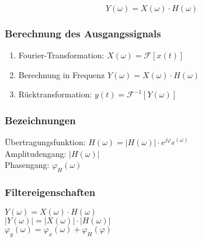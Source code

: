 \begin{multicols}{2}
    $$ Y(\omega) = X(\omega) \cdot H(\omega)$$

    \subsubsection*{Berechnung des Ausgangssignals}
\begin{enumerate}
   \item Fourier-Transformation:  $X(\omega) = \mathcal{F}[x(t)]$ 
   \item Berechnung in Frequenz  $Y(\omega) = X(\omega) \cdot H(\omega)$ 
   \item Rücktransformation:  $y(t) = \mathcal{F}^{-1}[Y(\omega)]$ 
\end{enumerate}


    \subsubsection*{Bezeichnungen}
    Übertragungsfunktion: $H(\omega)=|H(\omega)| \cdot e^{j\varphi_H(\omega)}$ \\
    Amplitudengang: $|H(\omega)|$ \\
    Phasengang: $\varphi_H(\omega)$ \\

    \subsubsection*{Filtereigenschaften}
    $Y(\omega) = X(\omega) \cdot H(\omega)$ \\
    $|Y(\omega)| = |X(\omega)| \cdot |H(\omega)|$ \\
    $\varphi_y(\omega) = \varphi_x(\omega) + \varphi_H(\varphi)$


\end{multicols}
